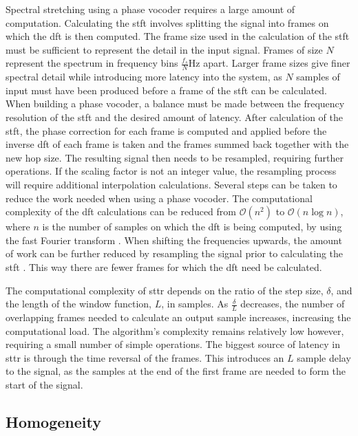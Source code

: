 		Spectral stretching using a phase vocoder requires a large amount of computation. Calculating the
		\acrshort{stft} involves splitting the signal into frames on which the \acrshort{dft} is then computed. The
		frame size used in the calculation of the \acrshort{stft} must be sufficient to represent the detail in the
		input signal. Frames of size $N$ represent the spectrum in frequency bins $\frac{f_{s}}{N}$Hz apart. Larger
		frame sizes give finer spectral detail while introducing more latency into the system, as $N$ samples of
		input must have been produced before a frame of the \acrshort{stft} can be calculated. When building a
		phase vocoder, a balance must be made between the frequency resolution of the \acrshort{stft} and the
		desired amount of latency. After calculation of the \acrshort{stft}, the phase correction for each frame is
		computed and applied before the inverse \acrshort{dft} of each frame is taken and the frames summed back
		together with the new hop size. The resulting signal then needs to be resampled, requiring further
		operations. If the scaling factor is not an integer value, the resampling process will require additional
		interpolation calculations. Several steps can be taken to reduce the work needed when using a phase
		vocoder. The computational complexity of the \acrshort{dft} calculations can be reduced from $\mathcal{O}
		\left( n^{2} \right)$ to $\mathcal{O}(n\log{n})$, where $n$ is the number of samples on which the
		\acrshort{dft} is being computed, by using the fast Fourier transform \citep{portnoff1976implementation}.
		When shifting the frequencies upwards, the amount of work can be further reduced by resampling the signal
		prior to calculating the \acrshort{stft} \citep{laroche1999new}. This way there are fewer frames for which
		the \acrshort{dft} need be calculated.

		The computational complexity of \acrshort{sttr} depends on the ratio of the step size, $\delta$, and the
		length of the window function, $L$, in samples. As $\frac{\delta}{L}$ decreases, the number of overlapping
		frames needed to calculate an output sample increases, increasing the computational load. The algorithm's
		complexity remains relatively low however, requiring a small number of simple operations. The biggest
		source of latency in \acrshort{sttr} is through the time reversal of the frames. This introduces an $L$
		sample delay to the signal, as the samples at the end of the first frame are needed to form the start of
		the signal.

	\subsection{Homogeneity}
	\label{sec:ExcitationEvaluation-Comparison-Homogeneity}
